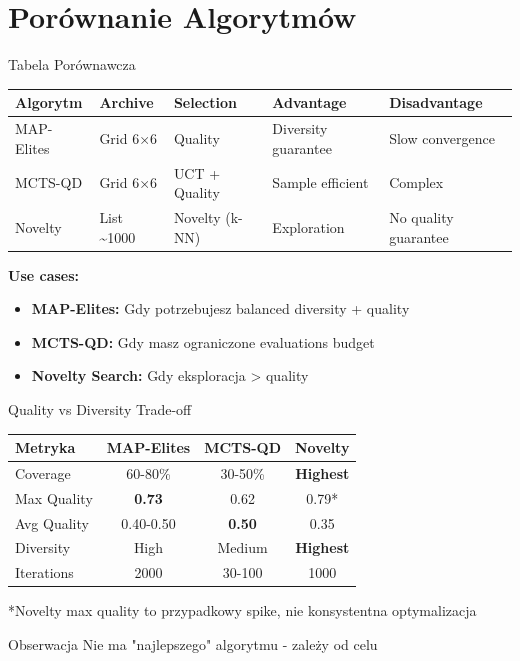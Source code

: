 \documentclass{beamer}
\begin{document}
\section{Porównanie Algorytmów}

\begin{frame}{Tabela Porównawcza}
\begin{table}
\centering
\scriptsize
\begin{tabular}{lllll}
\toprule
\textbf{Algorytm} & \textbf{Archive} & \textbf{Selection} & \textbf{Advantage} & \textbf{Disadvantage} \\
\midrule
MAP-Elites & Grid 6×6 & Quality & Diversity guarantee & Slow convergence \\
MCTS-QD & Grid 6×6 & UCT + Quality & Sample efficient & Complex \\
Novelty & List \textasciitilde1000 & Novelty (k-NN) & Exploration & No quality guarantee \\
\bottomrule
\end{tabular}
\end{table}

\vspace{0.5cm}
\textbf{Use cases:}
\begin{itemize}
\item \textbf{MAP-Elites:} Gdy potrzebujesz balanced diversity + quality
\item \textbf{MCTS-QD:} Gdy masz ograniczone evaluations budget
\item \textbf{Novelty Search:} Gdy eksploracja > quality
\end{itemize}
\end{frame}

\begin{frame}{Quality vs Diversity Trade-off}
\begin{table}
\centering
\begin{tabular}{lccc}
\toprule
\textbf{Metryka} & \textbf{MAP-Elites} & \textbf{MCTS-QD} & \textbf{Novelty} \\
\midrule
Coverage & 60-80\% & 30-50\% & \textbf{Highest} \\
Max Quality & \textbf{0.73} & 0.62 & 0.79* \\
Avg Quality & 0.40-0.50 & \textbf{0.50} & 0.35 \\
Diversity & High & Medium & \textbf{Highest} \\
Iterations & 2000 & 30-100 & 1000 \\
\bottomrule
\end{tabular}
\end{table}

\vspace{0.3cm}
\footnotesize{*Novelty max quality to przypadkowy spike, nie konsystentna optymalizacja}

\vspace{0.5cm}
\begin{block}{Obserwacja}
Nie ma "najlepszego" algorytmu - zależy od celu
\end{block}
\end{frame}
\end{document}
